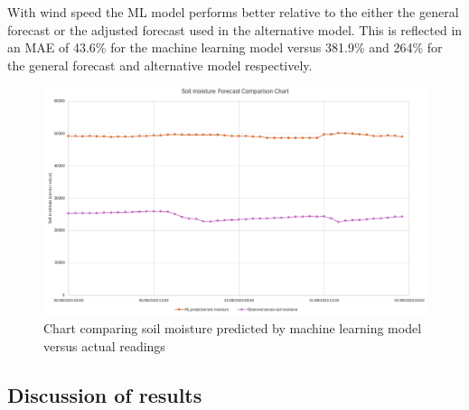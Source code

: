 With wind speed the ML model performs better relative to the either the general
forecast or the adjusted forecast used in the alternative model. This is
reflected in an MAE of 43.6\% for the machine learning model versus 381.9\% and
264\% for the general forecast and alternative model respectively.

\begin{figure}[H]
    \centering
    \includegraphics[width=1\textwidth]{contents/part-4/fig4/soil-graph.png}
    \caption{Chart comparing soil moisture predicted by machine learning model versus actual readings}
    \label{fig:soil-chart}
\end{figure}

\subsection{Discussion of results}
